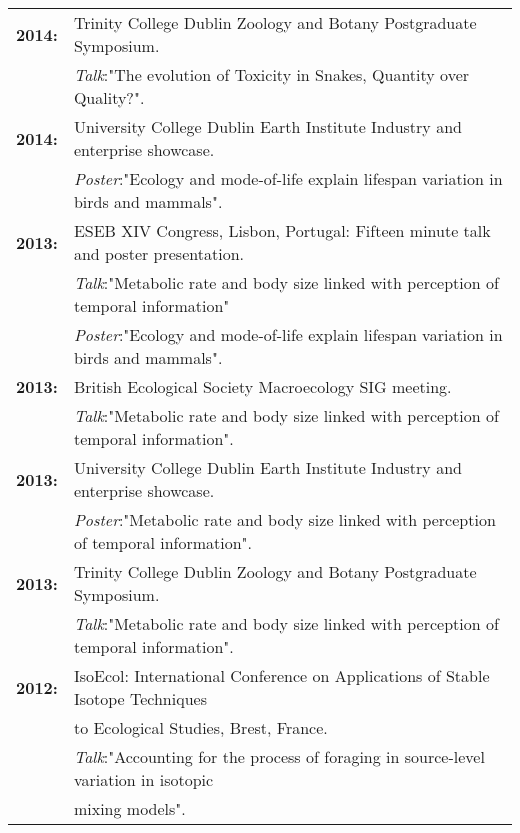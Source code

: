 \documentclass[10pt,a4paper]{article}
\begin{document}
\raggedright
\begin{tabular}{ll}
\textbf{2014:} & Trinity College Dublin Zoology and Botany Postgraduate Symposium.\\ 
& \textsl{Talk}:"The evolution of Toxicity in Snakes, Quantity over Quality?".\\
\textbf{2014:} & University College Dublin Earth Institute Industry and enterprise showcase.\\
&\textsl{Poster}:"Ecology and mode-of-life explain lifespan variation in birds and mammals".\\
\textbf{2013:} & ESEB XIV Congress, Lisbon, Portugal: Fifteen minute talk and poster presentation.\\
&\textsl{Talk}:"Metabolic rate and body size linked with perception of temporal information"\\
& \textsl{Poster}:"Ecology and mode-of-life explain lifespan variation in birds and mammals".\\
\textbf{2013:} & British Ecological Society Macroecology SIG meeting.\\
&\textsl{Talk}:"Metabolic rate and body size linked with perception of temporal information".\\
\textbf{2013:} & University College Dublin Earth Institute Industry and enterprise showcase.\\
&\textsl{Poster}:"Metabolic rate and body size linked with perception of temporal information".\\
\textbf{2013:} & Trinity College Dublin Zoology and Botany Postgraduate Symposium.\\
&\textsl{Talk}:"Metabolic rate and body size linked with perception of temporal information".\\
\textbf{2012:} & IsoEcol: International Conference on Applications of Stable Isotope Techniques\\
&to Ecological Studies, Brest, France.\\
 &\textsl{Talk}:"Accounting for the process of foraging in source-level variation in isotopic\\
& mixing models".\\


\end{tabular}
\bigskip

\end{document}

